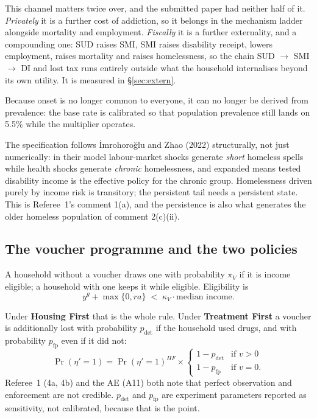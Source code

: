 \documentclass[11pt]{article}
\begin{document}
This channel matters twice over, and the submitted paper had neither half of
it. \emph{Privately} it is a further cost of addiction, so it belongs in the
mechanism ladder alongside mortality and employment. \emph{Fiscally} it is a
further externality, and a compounding one: SUD raises SMI, SMI raises disability
receipt, lowers employment, raises mortality and raises homelessness, so the
chain SUD $\rightarrow$ SMI $\rightarrow$ DI and lost tax runs entirely outside
what the household internalises beyond its own utility. It is measured in
\S\ref{sec:extern}.

Because onset is no longer common to everyone, it can no longer be derived
from prevalence: the base rate is calibrated so that population prevalence still
lands on 5.5\% while the multiplier operates.

The specification follows \.{I}mrohoro\u{g}lu and Zhao (2022) structurally, not
just numerically: in their model labour-market shocks generate \emph{short}
homeless spells while health shocks generate \emph{chronic} homelessness, and
expanded means tested disability income is the effective policy for the chronic
group. Homelessness driven purely by income risk is transitory; the persistent
tail needs a persistent state. This is Referee~1's comment 1(a), and the
persistence is also what generates the older homeless population of comment
2(c)(ii).

\subsection{The voucher programme and the two policies}

A household without a voucher draws one with probability $\pi_V$ if it is income
eligible; a household with one keeps it while eligible. Eligibility is
\begin{equation}
y^{g}+\max\{0,ra\}\;<\;\kappa_V\cdot\text{median income}.
\end{equation}

Under \textbf{Housing First} that is the whole rule. Under \textbf{Treatment
First} a voucher is additionally lost with probability $p_{\text{det}}$ if the
household used drugs, and with probability $p_{\text{fp}}$ even if it did not:
\begin{equation}
\Pr(\eta'=1)=\Pr(\eta'=1)^{HF}\times
\begin{cases}
1-p_{\text{det}} & \text{if } v>0\\
1-p_{\text{fp}} & \text{if } v=0 .
\end{cases}
\end{equation}
Referee~1 (4a, 4b) and the AE (A11) both note that perfect observation and
enforcement are not credible. $p_{\text{det}}$ and $p_{\text{fp}}$ are experiment
parameters reported as sensitivity, not calibrated, because that is the point.
\end{document}
